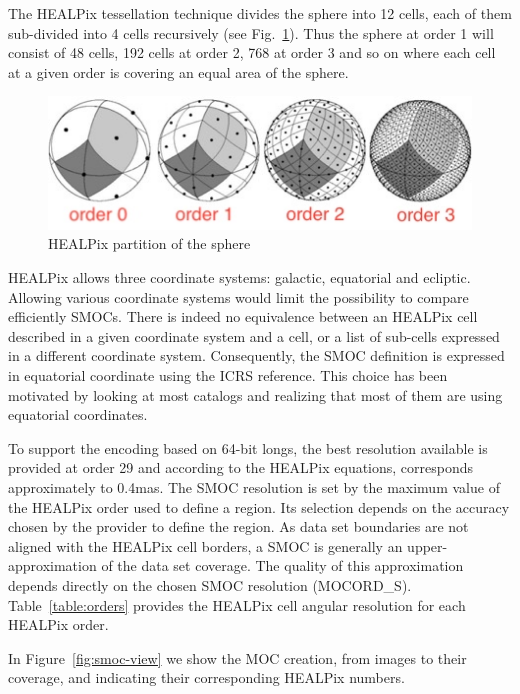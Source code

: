 \documentclass[11pt,a4paper]{ivoa}
\begin{document}
The HEALPix \citep{2005ApJ...622..759G} tessellation technique divides
the sphere into 12 cells, each of them sub-divided into 4 cells
recursively (see Fig.~\ref{fig:healpix}). Thus the sphere at order 1
will consist of 48 cells,
192 cells at order 2, 768 at order 3 and so on where each cell
at a given order is covering an equal area of the sphere.

\begin{figure}[!htbp]
\begin{center}
\includegraphics[scale=0.8]{healpix.jpg}
\end{center}
\caption{HEALPix partition of the sphere}
\label{fig:healpix}
\end{figure}

HEALPix allows three coordinate systems: galactic, equatorial and
ecliptic. Allowing various coordinate systems would limit the
possibility to compare efficiently SMOCs. There is indeed no
equivalence between an HEALPix cell described in a given coordinate
system and a cell, or a list of sub-cells expressed in a different
coordinate system. Consequently, the SMOC definition is expressed in
equatorial coordinate using the ICRS reference. This choice has been
motivated by looking at most catalogs and realizing that most of them
are using equatorial coordinates.

To support the encoding based on 64-bit longs, the best resolution
available is provided at order 29 and according to the HEALPix
equations, corresponds approximately to 0.4mas.  The SMOC resolution
is set by the maximum value of the HEALPix order used to define a
region. Its selection depends on the accuracy chosen by the provider
to define the region.  As data set boundaries are not aligned with the
HEALPix cell borders, a SMOC is generally an upper-approximation of
the data set coverage. The quality of this approximation depends
directly on the chosen SMOC resolution (MOCORD\_S).
Table~\ref{table:orders} provides the HEALPix cell angular resolution for
each HEALPix order.

In Figure~\ref{fig:smoc-view} we show the MOC creation, from images to their coverage,
and indicating their corresponding HEALPix numbers. 
\end{document}
